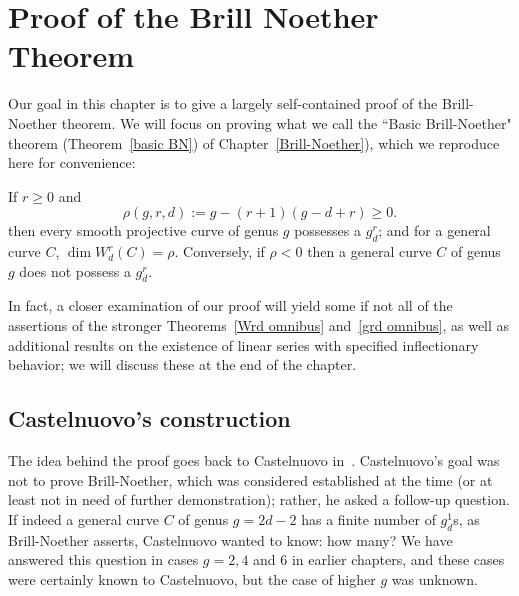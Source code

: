 

\chapter{Proof of the Brill Noether Theorem}\label{Brill Noether proof chapter}
\label{BrillNoetherproofChapter}

Our goal in this chapter is to give a largely self-contained proof of the Brill-Noether theorem. We will focus on proving what we call the ``Basic Brill-Noether" theorem (Theorem~\ref{basic BN}) of Chapter~\ref{Brill-Noether}), which we reproduce here for convenience:

\begin{theorem}
If $r\geq 0$ and
 $$
 \rho(g,r,d) := g - (r+1)(g-d+r) \geq 0.
$$
then every smooth projective curve of genus $g$  possesses a $g^r_d$; and for a general curve $C$,  $\dim W^r_d(C) = \rho$. Conversely, if $\rho < 0$ then a general curve $C$ of genus $g$ does not possess a $g^r_d$.
\end{theorem}

In fact, a closer examination of our proof will yield some if not all of the assertions of the stronger Theorems~\ref{Wrd omnibus} and~\ref{grd omnibus}, as well as additional results on the existence of linear series with specified inflectionary behavior; we will discuss these at the end of the chapter.


\section{Castelnuovo's construction}

The idea behind the proof goes back to Castelnuovo in~\cite{zbMATH02692307}. Castelnuovo's goal was not to prove Brill-Noether, which was considered established at the time (or at least not in need of further demonstration); rather, he asked a follow-up question. If indeed a general curve $C$ of genus $g = 2d-2$ has a finite number of $g^1_d$s, as Brill-Noether asserts, Castelnuovo wanted to know: how many? We have answered this question in cases $g = 2, 4$ and 6 in earlier chapters, and these cases were certainly known to Castelnuovo, but the case of higher $g$ was unknown.

